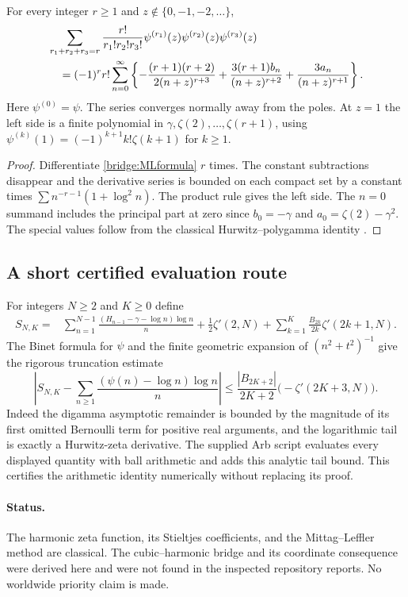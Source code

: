 \begin{corollary}\label{bridge:polygamma}
For every integer $r\ge1$ and $z\notin\{0,-1,-2,\ldots\}$,
\begin{align}
 &\sum_{r_1+r_2+r_3=r}\frac{r!}{r_1!r_2!r_3!}
       \psi^{(r_1)}(z)\psi^{(r_2)}(z)\psi^{(r_3)}(z)\notag\\
 &\quad=(-1)^r r!\sum_{n=0}^{\infty}
   \left\{-\frac{(r+1)(r+2)}{2(n+z)^{r+3}}
       +\frac{3(r+1)b_n}{(n+z)^{r+2}}
       +\frac{3a_n}{(n+z)^{r+1}}\right\}.
 \label{bridge:allpolygamma}
\end{align}
Here $\psi^{(0)}=\psi$. The series converges normally away from
the poles. At $z=1$ the left side is a finite polynomial in
$\gamma,\zeta(2),\ldots,\zeta(r+1)$, using
$\psi^{(k)}(1)=(-1)^{k+1}k!\zeta(k+1)$ for $k\ge1$.
\end{corollary}
\begin{proof}
Differentiate \eqref{bridge:MLformula} $r$ times. The constant
subtractions disappear and the derivative series is bounded on each
compact set by a constant times
$\sum n^{-r-1}(1+\log^2n)$. The product rule gives the left
side. The $n=0$ summand includes the principal part at zero since
$b_0=-\gamma$ and $a_0=\zeta(2)-\gamma^2$. The special values
follow from the classical Hurwitz--polygamma identity
\cite[Section~25.11]{DLMFhurwitz}.
\end{proof}

\subsection{A short certified evaluation route}

For integers $N\ge2$ and $K\ge0$ define
\begin{align*}
 S_{N,K}={}&\sum_{n=1}^{N-1}
  \frac{(H_{n-1}-\gamma-\log n)\log n}{n}
   +\frac12\zeta'(2,N)
   +\sum_{k=1}^K\frac{B_{2k}}{2k}\zeta'(2k+1,N).
\end{align*}
The Binet formula for $\psi$ \cite[Section~5.9]{DLMFgamma} and the finite geometric expansion of
$(n^2+t^2)^{-1}$ give the rigorous truncation estimate
\begin{equation}\label{bridge:tail-bound}
 \left|S_{N,K}-\sum_{n\ge1}
  \frac{(\psi(n)-\log n)\log n}{n}\right|
 \le \frac{|B_{2K+2}|}{2K+2}\bigl(-\zeta'(2K+3,N)\bigr).
\end{equation}
Indeed the digamma asymptotic remainder is bounded by the magnitude of
its first omitted Bernoulli term for positive real arguments, and the
logarithmic tail is exactly a Hurwitz-zeta derivative.
The supplied Arb script evaluates every displayed quantity with ball
arithmetic and adds this analytic tail bound.  This certifies the
arithmetic identity numerically without replacing its proof.

\paragraph{Status.}
The harmonic zeta function, its Stieltjes coefficients, and the
Mittag--Leffler method are classical.  The cubic--harmonic bridge and
its coordinate consequence were derived here and were not found in the
inspected repository reports.  No worldwide priority claim is made.
